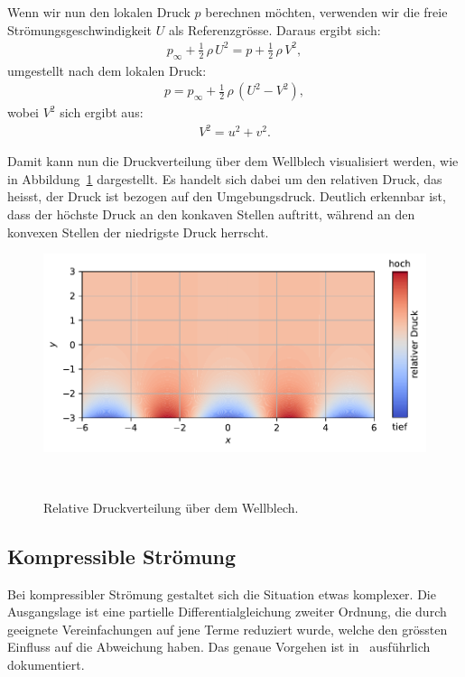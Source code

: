Wenn wir nun den lokalen Druck $p$ berechnen möchten, 
verwenden wir die freie Strömungsgeschwindigkeit $U$
als Referenzgrösse. 
Daraus ergibt sich:
\begin{align*}
    p_\infty 
    + 
    \frac{1}{2}\,\rho\,U^2 
    = 
    p 
    + 
    \frac{1}{2}\,\rho\,V^2,
\end{align*}
umgestellt nach dem lokalen Druck:
\begin{align*}
    p = p_\infty + \frac{1}{2}\,\rho\,(U^2 - V^2),
\end{align*}
wobei $V^2$ sich ergibt aus:
\begin{align*}
    V^2 = u^2 + v^2.
\end{align*}

Damit kann nun die Druckverteilung über dem Wellblech visualisiert werden, 
wie in Abbildung~\ref{fig:druckverteilung} dargestellt. 
Es handelt sich dabei um den relativen Druck, 
das heisst, der Druck ist bezogen auf den Umgebungsdruck. 
Deutlich erkennbar ist, dass der höchste Druck an den konkaven Stellen auftritt, 
während an den konvexen Stellen der niedrigste Druck herrscht.
\begin{figure}
    \centering
    \includegraphics[width=\textwidth]{papers/ueberschall/figures/Druckverteilung.pdf}
    \caption{Relative Druckverteilung über dem Wellblech.}
    ~\label{fig:druckverteilung}  
\end{figure}

\subsection{Kompressible Strömung}
Bei kompressibler Strömung gestaltet sich die Situation etwas komplexer.
Die Ausgangslage ist eine partielle Differentialgleichung zweiter Ordnung,
die durch geeignete Vereinfachungen auf jene Terme reduziert wurde, 
welche den grössten Einfluss auf die Abweichung haben.
Das genaue Vorgehen ist in~\cite{Ackeret1928} ausführlich dokumentiert.

